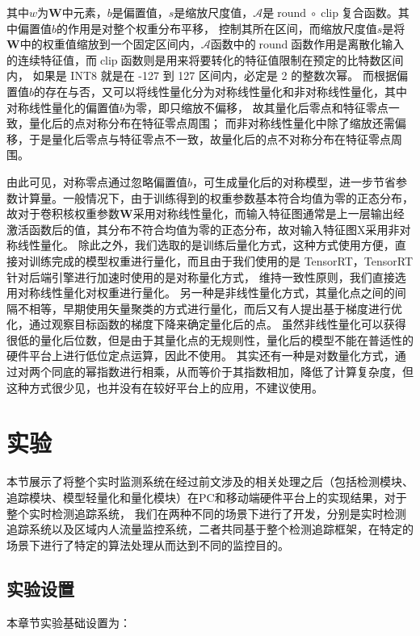 其中$w$为$\bm{W}$中元素，$b$是偏置值，$s$是缩放尺度值，$\mathcal{A}$是$\operatorname{round}\circ\operatorname{clip}$复合函数。其中偏置值$b$的作用是对整个权重分布平移，
控制其所在区间，而缩放尺度值$s$是将$\bm{W}$中的权重值缩放到一个固定区间内，$\mathcal{A}$函数中的$\operatorname{round}$函数作用是离散化输入的连续特征值，而$\operatorname{clip}$函数则是用来将要转化的特征值限制在预定的比特数区间内，
如果是 INT8 就是在 -127 到 127 区间内，必定是 2 的整数次幂。
而根据偏置值$b$的存在与否，又可以将线性量化分为对称线性量化和非对称线性量化，其中对称线性量化的偏置值$b$为零，即只缩放不偏移，
故其量化后零点和特征零点一致，量化后的点对称分布在特征零点周围；
而非对称线性量化中除了缩放还需偏移，于是量化后零点与特征零点不一致，故量化后的点不对称分布在特征零点周围。

由此可见，对称零点通过忽略偏置值$b$，可生成量化后的对称模型，进一步节省参数计算量。一般情况下，由于训练得到的权重参数基本符合均值为零的正态分布，
故对于卷积核权重参数$\bm{W}$采用对称线性量化，而输入特征图通常是上一层输出经激活函数后的值，其分布不符合均值为零的正态分布，故对输入特征图X采用非对称线性量化。
除此之外，我们选取的是训练后量化方式，这种方式使用方便，直接对训练完成的模型权重进行量化，而且由于我们使用的是 TensorRT，TensorRT 针对后端引擎进行加速时使用的是对称量化方式，
维持一致性原则，我们直接选用对称线性量化对权重进行量化。
另一种是非线性量化方式，其量化点之间的间隔不相等，早期使用矢量聚类的方式进行量化，而后又有人提出基于梯度进行优化，通过观察目标函数的梯度下降来确定量化后的点。
虽然非线性量化可以获得很低的量化后位数，但是由于其量化点的无规则性，量化后的模型不能在普适性的硬件平台上进行低位定点运算，因此不使用。
其实还有一种是对数量化方式，通过对两个同底的幂指数进行相乘，从而等价于其指数相加，降低了计算复杂度，但这种方式很少见，也并没有在较好平台上的应用，不建议使用。

\section{实验}
\label{sec4-4}
本节展示了将整个实时监测系统在经过前文涉及的相关处理之后（包括检测模块、追踪模块、模型轻量化和量化模块）在PC和移动端硬件平台上的实现结果，对于整个实时检测追踪系统，
我们在两种不同的场景下进行了开发，分别是实时检测追踪系统以及区域内人流量监控系统，二者共同基于整个检测追踪框架，在特定的场景下进行了特定的算法处理从而达到不同的监控目的。

\subsection{实验设置}
\label{sec4-4-1}
本章节实验基础设置为：

